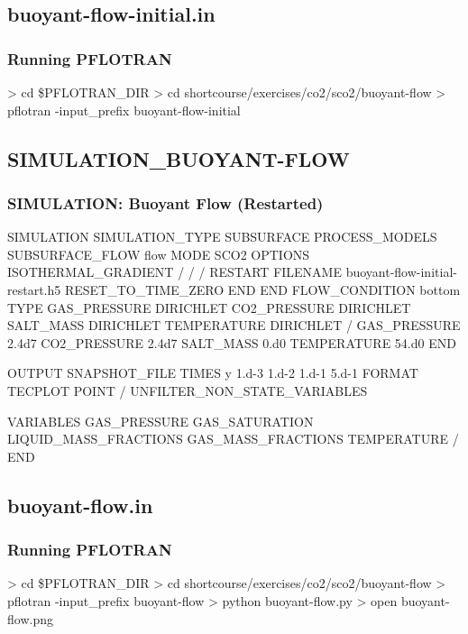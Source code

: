 \documentclass{beamer}
\newcommand\redcomment[1]{{{\color{red} #1}}}
\begin{document}
\subsection{buoyant-flow-initial.in}

\begin{frame}[fragile]\frametitle{Running PFLOTRAN}

\begin{semiverbatim}

> cd \$PFLOTRAN_DIR
> cd shortcourse/exercises/co2/sco2/buoyant-flow
> pflotran -input_prefix buoyant-flow-initial

\end{semiverbatim}

\end{frame}

\subsection{SIMULATION\_BUOYANT-FLOW}

\begin{frame}\frametitle{SIMULATION: Buoyant Flow (Restarted)}

\begin{semiverbatim}
SIMULATION
  SIMULATION_TYPE SUBSURFACE
  PROCESS_MODELS
    SUBSURFACE_FLOW flow
      MODE SCO2
      \redcomment{OPTIONS}
        \redcomment{ISOTHERMAL_GRADIENT}
      \redcomment{/}
    /
  /
\redcomment{  RESTART}
  \redcomment{  FILENAME buoyant-flow-initial-restart.h5}
  \redcomment{  RESET_TO_TIME_ZERO}
\redcomment{  END}
END
\newpage
\redcomment{FLOW_CONDITION bottom}
  \redcomment{TYPE}
    \redcomment{GAS_PRESSURE DIRICHLET}
    \redcomment{CO2_PRESSURE DIRICHLET}
    \redcomment{SALT_MASS DIRICHLET}
    \redcomment{TEMPERATURE DIRICHLET}
  \redcomment{/}
  \redcomment{GAS_PRESSURE 2.4d7}
  \redcomment{CO2_PRESSURE 2.4d7}
  \redcomment{SALT_MASS 0.d0}
  \redcomment{TEMPERATURE 54.d0}
\redcomment{END}

\newpage
\redcomment{OUTPUT}
  \redcomment{SNAPSHOT_FILE}
    \redcomment{TIMES y 1.d-3 1.d-2 1.d-1 5.d-1}
    \redcomment{FORMAT TECPLOT POINT}
  \redcomment{/}
  \redcomment{UNFILTER_NON_STATE_VARIABLES}

  \redcomment{VARIABLES}
   \redcomment{GAS_PRESSURE}
   \redcomment{GAS_SATURATION}
   \redcomment{LIQUID_MASS_FRACTIONS}
   \redcomment{GAS_MASS_FRACTIONS}
   \redcomment{TEMPERATURE}
  \redcomment{/}
\redcomment{END}
\end{semiverbatim}

\end{frame}
\subsection{buoyant-flow.in}

\begin{frame}[fragile]\frametitle{Running PFLOTRAN}

\begin{semiverbatim}

> cd \$PFLOTRAN_DIR
> cd shortcourse/exercises/co2/sco2/buoyant-flow
> pflotran -input_prefix buoyant-flow
> python buoyant-flow.py
> open buoyant-flow.png
\end{semiverbatim}

\end{frame}
\end{document}
